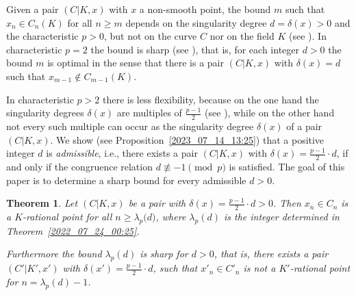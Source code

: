 \documentclass[12pt,reqno]{amsart}%
\newtheorem{thm}[prop]{Theorem}
\theoremstyle{definition}
\theoremstyle{remark}
\newcommand{\de}{\delta}
\newcommand{\lam}{\lambda}
\begin{document}
Given a pair $(C|K,x)$ with $x$ a non-smooth point,
the bound $m$ such that $x_n \in C_n(K)$ for all $n\geq m$ depends on the singularity degree $d=\de(x)>0$ and the characteristic $p>0$, but not on the curve $C$ nor on the field $K$ (see \cite[Theorem~1.1]{HiSt22}).
In characteristic $p=2$ the bound is sharp (see \cite[Proposition~2.25]{HiSt22}), that is, for each integer $d>0$ the bound $m$ is optimal in the sense that there is a pair $(C|K,x)$ with $\de(x) = d$ such that $x_{m-1} \notin C_{m-1}(K)$.

In characteristic $p>2$ there is less flexibility, because on the one hand the singularity degrees $\de(x)$ are multiples of $\frac{p-1}2$ (see \cite[Proposition~2.5]{HiSt22}), while on the other hand
not every such multiple can occur as the singularity degree $\de(x)$ of a pair $(C|K,x)$.
We show (see Proposition~\ref{2023_07_14_13:25}) that a positive integer $d$ is \textit{admissible}, i.e., there exists a pair $(C|K,x)$ with $\de(x) = \frac{p-1}2 {\cdot} d$, %
if and only if the congruence relation $d \not \equiv -1 \pmod p$ is satisfied.
The goal of this paper is to determine a sharp bound for every admissible $d>0$.


\begin{thm}\label{2025_05_22_11:10}
Let $(C|K,x)$ be a pair with $\de(x) = \frac{p-1}2 {\cdot}d > 0$. 
Then $x_n \in C_n$ is a $K$-rational point for all $n \geq \lam_p \big( d \big)$, where $\lam_p(d)$ is the integer determined in Theorem~\ref{2022_07_24_00:25}.

Furthermore the bound $\lam_p(d)$ is sharp for $d>0$, that is, 
there exists a pair $(C'|K',x')$ with $\de(x') = \frac{p-1}2 {\cdot}d$,
such that $x'_n \in C'_n$ is not a $K'$-rational point for $n=\lam_p(d)-1$.
\end{thm}
\end{document}
